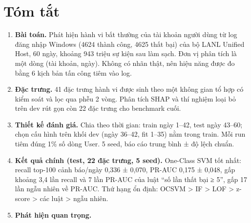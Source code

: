 \documentclass[
  11pt,
]{article}
\providecommand{\tightlist}{%
  \setlength{\itemsep}{0pt}\setlength{\parskip}{0pt}}
\begin{document}
\tableofcontents

\hypertarget{tuxf3m-tux1eaft}{%
\section{Tóm tắt}\label{tuxf3m-tux1eaft}}

\begin{enumerate}
\def\labelenumi{\arabic{enumi}.}
\tightlist
\item
  \textbf{Bài toán.} Phát hiện hành vi bất thường của tài khoản người
  dùng từ log đăng nhập Windows (4624 thành công, 4625 thất bại) của bộ
  LANL Unified Host, 60 ngày, khoảng 943 triệu sự kiện sau làm sạch. Đơn
  vị phân tích là một dòng (tài khoản, ngày). Không có nhãn thật, nên
  hiệu năng được đo bằng 6 kịch bản tấn công tiêm vào log.
\item
  \textbf{Đặc trưng.} 41 đặc trưng hành vi được sinh theo một không gian
  tổ hợp có kiểm soát và lọc qua phễu 2 vòng. Phân tích SHAP và thí
  nghiệm loại bỏ trên dev rút gọn còn 22 đặc trưng cho benchmark cuối.
\item
  \textbf{Thiết kế đánh giá.} Chia theo thời gian: train ngày 1--42,
  test ngày 43--60; chọn cấu hình trên khối dev (ngày 36--42, fit 1--35)
  nằm trong train. Mỗi run tiêm đúng 1\% số dòng User. 5 seed, báo cáo
  trung bình ± độ lệch chuẩn.
\item
  \textbf{Kết quả chính (test, 22 đặc trưng, 5 seed).} One-Class SVM tốt
  nhất: recall top-100 cảnh báo/ngày 0,336 ± 0,070, PR-AUC 0,175 ±
  0,048, gấp khoảng 3,4 lần recall và 7 lần PR-AUC của luật ``số lần
  thất bại ≥ 5'', gấp 17 lần ngẫu nhiên về PR-AUC. Thứ hạng ổn định:
  OCSVM \textgreater{} IF \textgreater{} LOF \textgreater{} z-score
  \textgreater{} các luật \textgreater{} ngẫu nhiên.
\item
  \textbf{Phát hiện quan trọng.}


\end{enumerate}
\end{document}

